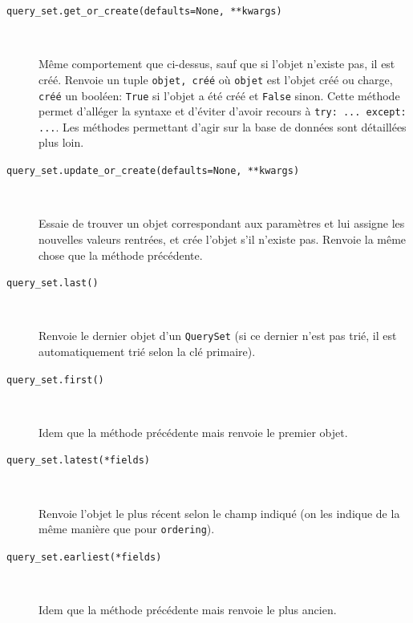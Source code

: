 \documentclass[a4paper, 10pt]{article}
\begin{document}
{\begin{itemize}
\begin{description}
        \item[\texttt{query_set.get_or_create(defaults=None, **kwargs)}]~

        Même comportement que ci-dessus, sauf que si l'objet n'existe pas, il est créé. Renvoie un tuple \texttt{objet, créé} où \texttt{objet} est l'objet créé ou charge, \texttt{créé} un booléen: \texttt{True} si l'objet a été créé et \texttt{False} sinon. Cette méthode permet d'alléger la syntaxe et d'éviter d'avoir recours à \texttt{try: ... except: ...}. Les méthodes permettant d'agir sur la base de données sont détaillées plus loin.

        \item[\texttt{query_set.update_or_create(defaults=None, **kwargs)}]~

        Essaie de trouver un objet correspondant aux paramètres et lui assigne les nouvelles valeurs rentrées, et crée l'objet s'il n'existe pas. Renvoie la même chose que la méthode précédente.

        \item[\texttt{query_set.last()}]~

        Renvoie le dernier objet d'un \texttt{QuerySet} (si ce dernier n'est pas trié, il est automatiquement trié selon la clé primaire).

        \item[\texttt{query_set.first()}]~

        Idem que la méthode précédente mais renvoie le premier objet.

        \item[\texttt{query_set.latest(*fields)}]~

        Renvoie l'objet le plus récent selon le champ indiqué (on les indique de la même manière que pour \texttt{ordering}).

        \item[\texttt{query_set.earliest(*fields)}]~

        Idem que la méthode précédente mais renvoie le plus ancien.

    \end{description}
\end{itemize}

}
\end{document}
